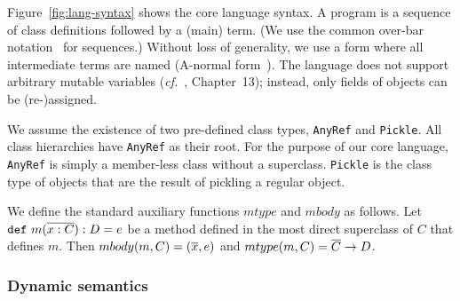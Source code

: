 Figure~\ref{fig:lang-syntax} shows the core language syntax. A program is a
sequence of class definitions followed by a (main) term. (We use the common
over-bar notation~\cite{Igarashi2001} for sequences.) Without loss of
generality, we use a form where all intermediate terms are named (A-normal
form~\cite{Flanagan93}). The language does not support arbitrary mutable
variables ({\em cf.}~\cite{TAPL}, Chapter~13); instead, only fields of objects
can be (re-)assigned.

We assume the existence of two pre-defined class types, \verb|AnyRef| and
\verb|Pickle|. All class hierarchies have \verb|AnyRef| as their root. For the
purpose of our core language, \verb|AnyRef| is simply a member-less class
without a superclass. \verb|Pickle| is the class type of objects that are the
result of pickling a regular object.

We define the standard auxiliary functions $mtype$ and $mbody$ as follows.
Let $\texttt{def}~m(\overline{x : C}) : D = e$ be a method defined in the
most direct superclass of $C$ that defines $m$. Then
$mbody(m, C) = (\overline{x}, e)$ and $mtype(m, C) = \overline{C} \rightarrow D$.

\vspace{0em}
\subsubsection{Dynamic semantics}


